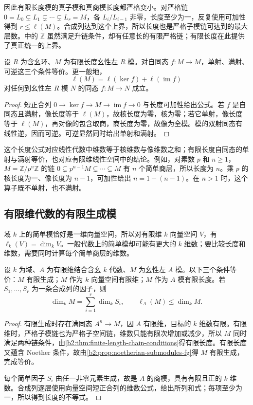 因此有限长度模的真子模和真商模长度都严格变小。对严格链 \(0=L_0\subsetneq L_1\subsetneq\cdots\subsetneq L_r=M\)，各 \(L_i/L_{i-1}\) 非零，长度至少为一，反复使用可加性得到 \(r\le\ell(M)\)。合成列达到这个上界，所以长度也是严格子模链可达到的最大层数。中的 \(\mathbb Z\) 虽然满足升链条件，却有任意长的有限严格链；有限长度在此提供了真正统一的上界。

\begin{proposition}\label{b2:prop:finite-length-endomorphism}
	设 \(R\) 为含幺环、\(M\) 为有限长度幺性左 \(R\) 模。对自同态 \(f:M\rightarrow M\)，单射、满射、可逆这三个条件等价。更一般地，
	\[
		\ell(M)=\ell(\ker f)+\ell(\operatorname{im}f)
	\]
	对任何到幺性左 \(R\) 模 \(N\) 的同态 \(f:M\to N\) 成立。
\end{proposition}
\begin{proof}
	短正合列 \(0\rightarrow\ker f\rightarrow M\rightarrow\operatorname{im}f\rightarrow0\) 与长度可加性给出公式。若 \(f\) 是自同态且满射，像长度等于 \(\ell(M)\)，故核长度为零，核为零；若它单射，像长度等于 \(\ell(M)\)，再对像的包含取商，商长度为零，故像为全模。模的双射同态有线性逆，因而可逆。可逆显然同时给出单射和满射。
\end{proof}

这个长度公式对应线性代数中维数等于核维数与像维数之和；有限长度自同态的单射与满射等价，也对应有限维线性空间中的结论。例如，对素数 \(p\) 和 \(n\ge1\)，\(M=\mathbb Z/p^n\mathbb Z\) 的链 \(0\subsetneq p^{n-1}M\subsetneq\cdots\subsetneq M\) 有 \(n\) 个简单商层，所以长度为 \(n\)。乘 \(p\) 的核长度为一、像长度为 \(n-1\)，可加性给出 \(n=1+(n-1)\)。在 \(n>1\) 时，这个算子既不单射，也不满射。

\subsection{有限维代数的有限生成模}
\label{b2:subsec:1202:03}

域 \(k\) 上的简单模恰好是一维向量空间，所以对有限维 \(k\) 向量空间 \(V\)，有 \(\ell_k(V)=\dim_kV\)。一般代数上的简单模却可能有更大的 \(k\) 维数；要比较长度和维数，需要同时计算每个简单商层的维数。

\begin{proposition}\label{b2:prop:finite-dimensional-algebra-modules}
	设 \(k\) 为域、\(A\) 为有限维结合含幺 \(k\) 代数、\(M\) 为幺性左 \(A\) 模。以下三个条件等价：\(M\) 有限生成；\(M\) 作为 \(k\) 向量空间有限维；\(M\) 作为 \(A\) 模有限长度。若 \(S_1,\ldots,S_r\) 为一条合成列的因子，则
	\[
		\dim_kM=\sum_{i=1}^r\dim_kS_i,\qquad \ell_A(M)\le\dim_kM.
	\]
\end{proposition}
\begin{proof}
	有限生成时存在满同态 \(A^n\rightarrow M\)，因 \(A\) 有限维，目标的 \(k\) 维数有限。有限维时，严格子模链也为严格子空间链，维数只能有限次增加或减少，所以 \(M\) 同时满足两种链条件，由\cref{b2:thm:finite-length-chain-conditions}得有限长度。有限长度又蕴含 Noether 条件，故由\cref{b2:prop:noetherian-submodules-fg}得 \(M\) 有限生成，完成等价。

	每个简单因子 \(S_i\) 由任一非零元素生成，故是 \(A\) 的商模，具有有限且正的 \(k\) 维数。合成列逐层使用向量空间短正合列的维数公式，给出所列和式；每项至少为一，所以得到长度的不等式。
\end{proof}

